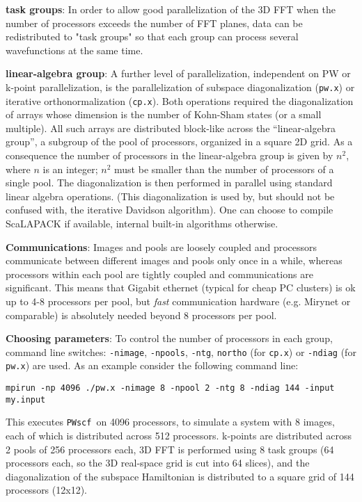 \documentclass[12pt,a4paper]{article}
\def\pw.x{\texttt{pw.x}}
\def\cp.x{\texttt{cp.x}}
\def\PWscf{\texttt{PWscf}}
\begin{document}
{\bf task groups}: 
In order to allow good parallelization of the 3D FFT when 
the number of processors exceeds the number of FFT planes,
data can be redistributed to "task groups" so that each group 
can process several wavefunctions at the same time.

{\bf linear-algebra group}:
A further level of parallelization, independent on
PW or k-point parallelization, is the parallelization of
subspace diagonalization (\pw.x) or iterative orthonormalization
(\cp.x). Both operations required the diagonalization of 
arrays whose dimension is the number of Kohn-Sham states
(or a small multiple). All such arrays are distributed block-like
across the ``linear-algebra group'', a subgroup of the pool of processors,
organized in a square 2D grid. As a consequence the number of processors
in the linear-algebra group is given by $n^2$, where $n$ is an integer;
$n^2$ must be smaller than the number of processors of a single pool.
The diagonalization is then performed
in parallel using standard linear algebra operations.
(This diagonalization is used by, but should not be confused with,
the iterative Davidson algorithm). One can choose to compile
ScaLAPACK if available, internal built-in algorithms otherwise.

{\bf Communications}:
Images and pools are loosely coupled and processors communicate
between different images and pools only once in a while, whereas
processors within each pool are tightly coupled and communications
are significant. This means that Gigabit ethernet (typical for
cheap PC clusters) is ok up to 4-8 processors per pool, but {\em fast}
communication hardware (e.g. Mirynet or comparable) is absolutely 
needed beyond 8 processors per pool.

{\bf Choosing parameters}:
To control the number of processors in each group,
command line switches: \texttt{-nimage}, \texttt{-npools},
\texttt{-ntg}, \texttt{northo} (for \cp.x) or \texttt{-ndiag}
(for \pw.x) are used.
As an example consider the following command line:
\begin{verbatim}
mpirun -np 4096 ./pw.x -nimage 8 -npool 2 -ntg 8 -ndiag 144 -input my.input
\end{verbatim}
This executes \PWscf\ on 4096 processors, to simulate a system
with 8 images, each of which is distributed across 512 processors.
k-points are distributed across 2 pools of 256 processors each, 
3D FFT is performed using 8 task groups (64 processors each, so
the 3D real-space grid is cut into 64 slices), and the diagonalization
of the subspace Hamiltonian is distributed to a square grid of 144
processors (12x12).
\end{document}
